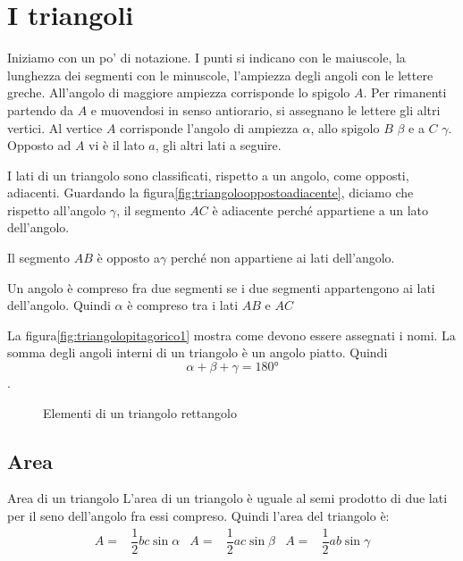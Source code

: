 \section{I triangoli}
Iniziamo con un po' di notazione. I punti si indicano con le  maiuscole, la lunghezza dei segmenti con le  minuscole,  l'ampiezza degli angoli con le lettere greche. All'angolo di maggiore  ampiezza corrisponde lo spigolo $A$. Per rimanenti partendo da $A$ e muovendosi in senso antiorario, si assegnano le lettere gli altri vertici. Al vertice $A$ corrisponde l'angolo di ampiezza $\alpha$, allo spigolo $B$ $\beta$ e a $C$ $\gamma$. Opposto ad $A$ vi è il lato $a$, gli altri lati a seguire.\par 
I lati di un triangolo sono classificati, rispetto a un angolo, come opposti,  adiacenti. Guardando la figura\nobs\vref{fig:triangolooppostoadiacente}, diciamo che rispetto all'angolo $\gamma$, il segmento $AC$ è adiacente perché appartiene a un  lato dell'angolo.\par  Il segmento  $AB$ è opposto a$\gamma$ perché  non appartiene ai lati  dell'angolo.\par
Un angolo è compreso fra due segmenti se i due segmenti appartengono ai lati dell'angolo. Quindi $\alpha$ è compreso tra i lati $AB$ e $AC$\par 
 La figura\nobs\vref{fig:triangolopitagorico1} mostra come devono essere assegnati i nomi.
La somma degli angoli interni di un triangolo è un angolo piatto. Quindi \[\alpha+\beta+\gamma=\ang{180}\]. 
\begin{figure}
	\centering
	
	\caption{Elementi di un triangolo rettangolo}
	\label{fig:triangolooppostoadiacente}
\end{figure}
\subsection{Area}
\begin{teoremat}{Area di un triangolo}{}
	L'area di un triangolo è uguale al semi prodotto di due lati per il seno dell'angolo fra essi compreso. 
	Quindi l'area del triangolo è:
	\begin{align*}
	A=&\dfrac{1}{2}bc\sin\alpha& A=&\dfrac{1}{2}ac\sin\beta& A=&\dfrac{1}{2}ab\sin\gamma \\
	\end{align*}
\end{teoremat}	
